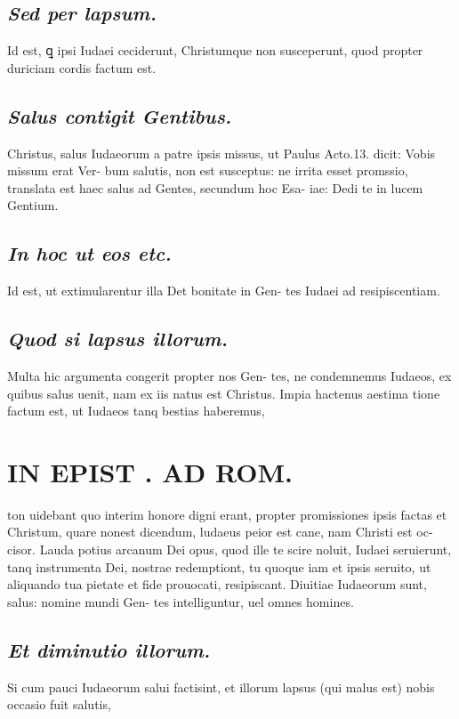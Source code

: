 \documentclass{article}
\begin{document}
\begin{pages}
\subsection*{\textit{Sed per lapsum. }}\pstart Id est, ꝗ ipsi Iudaei ceciderunt, Christumque non susceperunt, quod propter duriciam cordis factum est.  \pend
{}
{}
\subsection*{\textit{Salus contigit Gentibus. }}\pstart Christus, salus Iudaeorum a patre ipsis missus, ut Paulus Acto.13. dicit: Vobis missum erat Ver- bum salutis, non est susceptus: ne irrita esset promssio, translata est haec salus ad Gentes, secundum hoc Esa- iae: Dedi te in lucem Gentium.  \pend
{}
{}
\subsection*{\textit{In hoc ut eos etc. }}\pstart Id est, ut extimularentur illa Det bonitate in Gen- tes Iudaei ad resipiscentiam.   \pend
{}
{}
\subsection*{\textit{Quod si lapsus illorum. }}\pstart Multa hic argumenta congerit propter nos Gen- tes, ne condemnemus Iudaeos, ex quibus salus uenit, nam ex iis natus est Christus. Impia hactenus aestima tione factum est, ut Iudaeos tanq bestias haberemus,  \pend
\section*{IN EPIST . AD ROM.  }
\marginpar{[ p.n0 ]}\pstart ton uidebant quo interim honore digni erant, propter promissiones ipsis factas et Christum, quare nonest dicendum, ludaeus peior est cane, nam Christi est oc- cisor. Lauda potius arcanum Dei opus, quod ille te scire noluit, Iudaei seruierunt, tanq instrumenta Dei, nostrae redemptiont, tu quoque iam et ipsis seruito, ut aliquando tua pietate et fide prouocati, resipiscant.  Diuitiae Iudaeorum sunt, salus: nomine mundi Gen- tes intelliguntur, uel omnes homines.  \pend
{}
{}
\subsection*{\textit{Et diminutio illorum. }}\pstart Si cum pauci Iudaeorum salui factisint, et illorum lapsus (qui malus est) nobis occasio fuit salutis,  \pend
{}
{}

\end{pages}
\end{document}
